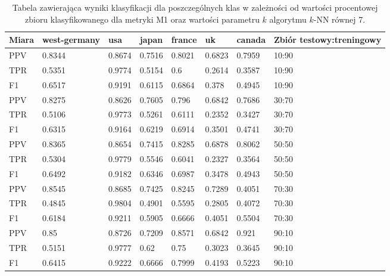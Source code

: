 \documentclass{classrep}
\begin{document}
\begin{table}[H]
    \centering
\caption{Tabela zawierająca wyniki klasyfikacji dla poszczególnych klas w zależności od wartości procentowej zbioru
klasyfikowanego dla metryki M1 oraz wartości parametru $k$ algorytmu $k$-NN równej 7.}
\begin{adjustbox}{max width=\textwidth}
    \begin{tabular}{|l|l|l|l|l|l|l|l|}
    \hline
        Miara & west-germany  & usa  & japan & france & uk & canada & Zbiór testowy:treningowy \\ \hline
        PPV & 0.8344 & 0.8674 & 0.7516 & 0.8021 & 0.6823 & 0.7959 & 10:90 \\ \hline
        TPR & 0.5351 & 0.9774 & 0.5154 & 0.6 & 0.2614 & 0.3587 & 10:90 \\ \hline
        F1 & 0.6517 & 0.9191 & 0.6115 & 0.6864 & 0.378 & 0.4945 & 10:90 \\ \hline
        PPV & 0.8275 & 0.8626 & 0.7605 & 0.796 & 0.6842 & 0.7686 & 30:70 \\ \hline
        TPR & 0.5106 & 0.9773 & 0.5261 & 0.6111 & 0.2352 & 0.3427 & 30:70 \\ \hline
        F1 & 0.6315 & 0.9164 & 0.6219 & 0.6914 & 0.3501 & 0.4741 & 30:70 \\ \hline
        PPV & 0.8365 & 0.8654 & 0.7415 & 0.8285 & 0.6878 & 0.8062 & 50:50 \\ \hline
        TPR & 0.5304 & 0.9779 & 0.5546 & 0.6041 & 0.2327 & 0.3564 & 50:50 \\ \hline
        F1 & 0.6492 & 0.9182 & 0.6346 & 0.6987 & 0.3478 & 0.4943 & 50:50 \\ \hline
        PPV & 0.8545 & 0.8685 & 0.7425 & 0.8245 & 0.7289 & 0.4051 & 70:30 \\ \hline
        TPR & 0.4845 & 0.9804 & 0.4901 & 0.5595 & 0.2805 & 0.4072 & 70:30 \\ \hline
        F1 & 0.6184 & 0.9211 & 0.5905 & 0.6666 & 0.4051 & 0.5504 & 70:30 \\ \hline
        PPV & 0.85 & 0.8726 & 0.7209 & 0.8571 & 0.6842 & 0.921 & 90:10 \\ \hline
        TPR & 0.5151 & 0.9777 & 0.62 & 0.75 & 0.3023 & 0.3645 & 90:10 \\ \hline
        F1 & 0.6415 & 0.9222 & 0.6666 & 0.7999 & 0.4193 & 0.5223 & 90:10 \\ \hline
    \end{tabular}
\end{adjustbox}
\end{table}
\end{document}
